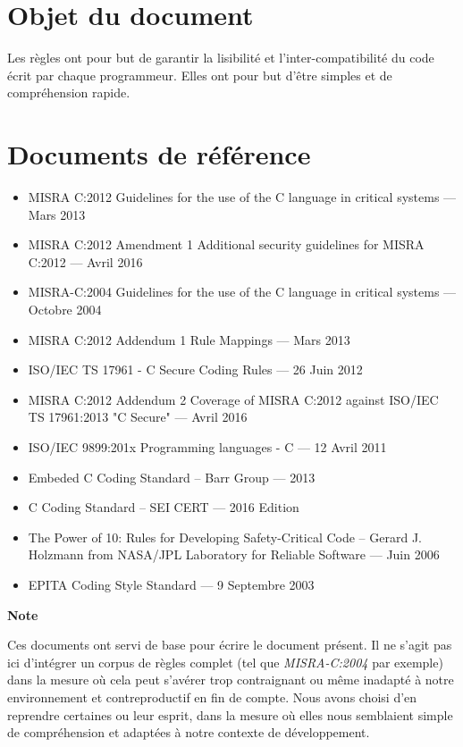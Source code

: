 \section{Objet du document}

Les règles ont pour but de garantir la lisibilité et l'inter-compatibilité du code écrit par chaque programmeur. Elles ont pour but d'être simples et de compréhension rapide.\bigskip

\section{Documents de référence}

\begin{itemize}
\item[\PencilRightDown] MISRA C:2012 Guidelines for the use of the C language in critical systems --- Mars 2013
\item[\PencilRightDown] MISRA C:2012 Amendment 1 Additional security guidelines for MISRA C:2012 --- Avril 2016
\item[\PencilRightDown] MISRA-C:2004 Guidelines for the use of the C language in critical systems --- Octobre 2004
\item[\PencilRightDown] MISRA C:2012 Addendum 1 Rule Mappings --- Mars 2013
\item[\PencilRightDown] ISO/IEC TS 17961 - C Secure Coding Rules --- 26 Juin 2012
\item[\PencilRightDown] MISRA C:2012 Addendum 2 Coverage of MISRA C:2012 against ISO/IEC TS 17961:2013 "C Secure" --- Avril 2016
\item[\PencilRightDown] ISO/IEC 9899:201x Programming languages - C --- 12 Avril 2011
\item[\PencilRightDown] Embeded C Coding Standard -- Barr Group --- 2013
\item[\PencilRightDown] C Coding Standard -- SEI CERT --- 2016 Edition
\item[\PencilRightDown] The Power of 10:
Rules for Developing Safety-Critical Code -- Gerard J. Holzmann from NASA/JPL Laboratory for Reliable Software --- Juin 2006
\item[\PencilRightDown] EPITA Coding Style Standard --- 9 Septembre 2003
\end{itemize}
\bigskip

\begin{large}
\textbf{Note}
\end{large}
\medskip

Ces documents ont servi de base pour écrire le document présent. Il ne s'agit pas ici d'intégrer un corpus de règles complet (tel que \textit{MISRA-C:2004} par exemple) dans la mesure où cela peut s'avérer trop contraignant ou même inadapté à notre environnement et contreproductif en fin de compte.
Nous avons choisi d'en reprendre certaines ou leur esprit, dans la mesure où elles nous semblaient simple de compréhension et adaptées à notre contexte de développement.

\pagebreak